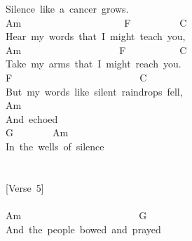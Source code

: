 \documentclass[]{book}
\begin{document}
Silence~like~a~cancer~grows.\\
Am~~~~~~~~~~~~~~~~~~~~~F~~~~~~~~~~C\\
Hear~my~words~that~I~might~teach~you,\\
Am~~~~~~~~~~~~~~~~~~~~F~~~~~~~~~~~C\\
Take~my~arms~that~I~might~reach~you.\\
\hspace*{0.333em}\hspace*{0.333em}\hspace*{0.333em}\hspace*{0.333em}\hspace*{0.333em}\hspace*{0.333em}\hspace*{0.333em}\hspace*{0.333em}\hspace*{0.333em}F~~~~~~~~~~~~~~~~~~~~~~~~~~C\\
But~my~words~like~silent~raindrops~fell,\\
\hspace*{0.333em}\hspace*{0.333em}\hspace*{0.333em}\hspace*{0.333em}\hspace*{0.333em}\hspace*{0.333em}Am\\
And~echoed\\
\hspace*{0.333em}\hspace*{0.333em}\hspace*{0.333em}\hspace*{0.333em}\hspace*{0.333em}\hspace*{0.333em}\hspace*{0.333em}G~~~~~~~~Am\\
In~the~wells~of~silence\\
~\\
~\\
{[}Verse~5{]}\\
~\\
Am~~~~~~~~~~~~~~~~~~~~~~~~G\\
And~the~people~bowed~and~prayed\\
\end{document}
